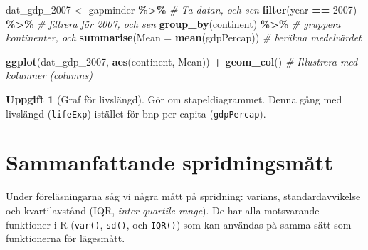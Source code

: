 \documentclass[
]{book}
\newenvironment{Shaded}{\begin{snugshade}}{\end{snugshade}}
\newcommand{\AttributeTok}[1]{\textcolor[rgb]{0.13,0.29,0.53}{#1}}
\newcommand{\CommentTok}[1]{\textcolor[rgb]{0.56,0.35,0.01}{\textit{#1}}}
\newcommand{\DecValTok}[1]{\textcolor[rgb]{0.00,0.00,0.81}{#1}}
\newcommand{\FunctionTok}[1]{\textcolor[rgb]{0.13,0.29,0.53}{\textbf{#1}}}
\newcommand{\NormalTok}[1]{#1}
\newcommand{\OtherTok}[1]{\textcolor[rgb]{0.56,0.35,0.01}{#1}}
\newcommand{\SpecialCharTok}[1]{\textcolor[rgb]{0.81,0.36,0.00}{\textbf{#1}}}
\theoremstyle{definition}
\theoremstyle{definition}
\theoremstyle{definition}
\newtheorem{exercise}{Uppgift}[chapter]
\theoremstyle{definition}
\theoremstyle{remark}
\begin{document}
\begin{Shaded}
\begin{Highlighting}[]
\NormalTok{dat\_gdp\_2007 }\OtherTok{\textless{}{-}}\NormalTok{ gapminder }\SpecialCharTok{\%\textgreater{}\%}       \CommentTok{\# Ta datan, och sen}
  \FunctionTok{filter}\NormalTok{(year }\SpecialCharTok{==} \DecValTok{2007}\NormalTok{) }\SpecialCharTok{\%\textgreater{}\%}          \CommentTok{\# filtrera för 2007, och sen}
  \FunctionTok{group\_by}\NormalTok{(continent) }\SpecialCharTok{\%\textgreater{}\%}           \CommentTok{\# gruppera kontinenter, och}
  \FunctionTok{summarise}\NormalTok{(}\AttributeTok{Mean =} \FunctionTok{mean}\NormalTok{(gdpPercap)) }\CommentTok{\# beräkna medelvärdet}

\FunctionTok{ggplot}\NormalTok{(dat\_gdp\_2007, }\FunctionTok{aes}\NormalTok{(continent, Mean)) }\SpecialCharTok{+}
  \FunctionTok{geom\_col}\NormalTok{()                  }\CommentTok{\# Illustrera med kolumner (columns)}
\end{Highlighting}
\end{Shaded}

\begin{exercise}[Graf för livslängd]
Gör om stapeldiagrammet. Denna gång med livslängd (\texttt{lifeExp}) istället för bnp per capita (\texttt{gdpPercap}).
\end{exercise}

\section{Sammanfattande spridningsmått}\label{sammanfattande-spridningsmuxe5tt}

Under föreläsningarna såg vi några mått på spridning: varians, standardavvikelse och kvartilavstånd (IQR, \emph{inter-quartile range}). De har alla motsvarande funktioner i R (\texttt{var()}, \texttt{sd()}, och \texttt{IQR()}) som kan användas på samma sätt som funktionerna för lägesmått.

\begin{Shaded}
\end{Shaded}
\end{document}
